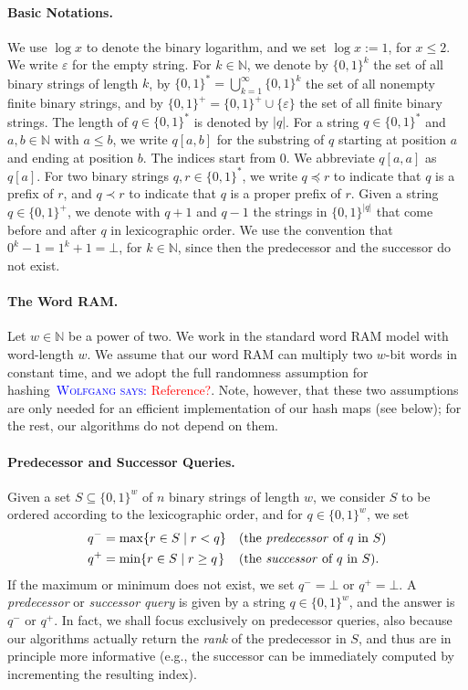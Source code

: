 \documentclass[a4paper,11pt]{article}
\newcommand{\eps}{\varepsilon}
\newcommand{\N}{\mathbb{N}}
\newcommand{\?}{\mskip1.5mu}
\newcommand{\aremark}[3]{\textcolor{blue}{\textsc{#1 #2:}}
  \textcolor{red}{\textsf{#3}}}
\newcommand{\wolfgang}[2][says]{\aremark{Wolfgang}{#1}{#2}}
\begin{document}
\paragraph{Basic Notations.}
We use $\log x$ to denote the binary logarithm, and we set 
$\log x := 1$, for $x \leq 2$.
We write $\eps$ for the empty string. For $k \in \N$, we denote by 
$\{0, 1\}^k$ the set of all binary strings of length $k$, by 
$\{0,1\}^* = \bigcup_{k = 1}^{\infty} \{0, 1\}^k$ the set of all
nonempty finite binary strings, and by 
$\{0,1\}^+ = \{0, 1\}^+ \cup \{\eps\}$ the set of all finite binary 
strings. The length of $q \in \{0, 1\}^*$ is denoted by $|q|$.
For a string $q \in \{0, 1\}^*$ and $a, b \in \N$ with $a \leq b$, 
we write $q[a, b]$ for the substring of $q$ starting at position
$a$ and ending at position $b$.  The indices start from $0$. 
We abbreviate $q[a, a]$ as $q[a]$. For two binary strings 
$q, r \in \{0,1\}^*$, we write $q \preceq r$ to indicate that $q$ is 
a prefix of $r$, and $q \prec r$ to indicate that $q$ is a proper 
prefix of $r$. Given a string 
$q \in \{0,1\}^+$, we denote with $q + 1$ and $q - 1$ the strings in 
$\{0, 1\}^{|q|}$ that come before and after $q$ in lexicographic 
order. We use the convention that $0^k - 1 = 1^k + 1 = \bot$, for 
$k \in \N$, since then the predecessor and the successor do 
not exist. 

\paragraph{The Word RAM.}
Let $w \in \N$ be a power of two. We work in the standard word RAM 
model with word-length $w$. We assume that our word RAM can multiply
two $w$-bit words in constant time, and we adopt the full 
randomness assumption for hashing~\wolfgang{Reference?}. Note, 
however, that these two assumptions are only needed for an 
efficient implementation of our hash maps (see below);
for the rest, our algorithms do not depend on them.

\paragraph{Predecessor and Successor Queries.}
Given a set $S \subseteq \{0, 1\}^w$ of $n$ binary strings of 
length $w$, we consider $S$ to be ordered according to the 
lexicographic order, and for $q \in \{0, 1\}^w$, we set
\begin{align*}
     q^- &= \max \{r \in S \mid r < q\} && 
        \text{(the \emph{predecessor} of $q$ in $S$)} \\
     q^+ &= \min \{r \in S \mid r \geq q\?\} && 
       \text{(the \emph{successor} of $q$ in $S$)}.
\end{align*}
If the maximum or minimum does not exist, we set $q^- = \bot$ or 
$q^+ = \bot$.  A \emph{predecessor} or \emph{successor query} is
given by a string $q \in \{0, 1\}^w$, and the answer is $q^-$ or 
$q^+$. In fact, we shall focus exclusively on predecessor queries, 
also because our algorithms actually return the \emph{rank} of the 
predecessor in $S$, and thus are in principle more informative 
(e.g., the successor can be immediately computed by incrementing 
the resulting index).
\end{document}
